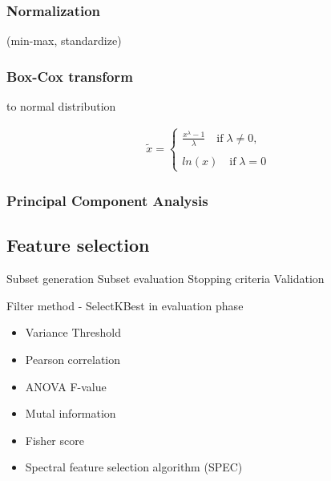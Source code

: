 \subsubsection{Normalization}
 (min-max, standardize)


\subsubsection{Box-Cox transform}

to normal distribution
\begin{ceqn}\begin{align}
\widetilde{x} =
\begin{cases}
\frac{x^\lambda - 1}{\lambda} \quad \mathrm{if} \;\lambda \neq 0, \\\\ 
ln(x)\quad \mathrm{if}\;\lambda = 0
\end{cases}
\label{equ:box-cox-transform}
\end{align}\end{ceqn}

\subsubsection{Principal Component Analysis}

\subsection{Feature selection}
Subset generation %
Subset evaluation
Stopping criteria
Validation

\cite{nandi_condition_2019} %
Filter method - SelectKBest  in evaluation phase
\begin{itemize}
\item Variance Threshold
\item Pearson correlation
\item ANOVA F-value
\item Mutal information
\item Fisher score
\item Spectral feature selection algorithm (SPEC)
\end{itemize}
